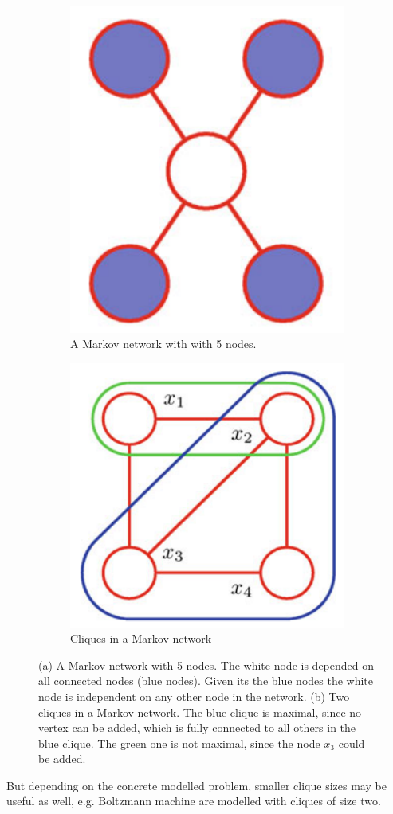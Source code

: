 \begin{figure}
	\centering
	\begin{subfigure}[t]{.5\textwidth}
  		\centering
  		\includegraphics[width=.5\linewidth]{imgs/markovnet1.png}
  		\caption{A Markov network with with 5 nodes.}
  		\label{fig:sub1}
	\end{subfigure}%
	\begin{subfigure}[t]{.5\textwidth}
  		\centering
  		\includegraphics[width=.5\linewidth]{imgs/markovnet2.png}
  		\caption{Cliques in a Markov network}
  		\label{fig:markovnet}
	\end{subfigure}
	\caption{(a) A Markov network with 5 nodes. The white node is depended on all connected nodes (blue nodes). Given its the blue nodes the white node is independent on any other node in the network. (b) Two cliques in a Markov network. The blue clique is maximal, since no vertex can be added, which is fully connected to all others in the blue clique. The green one is not maximal, since the node $x_3$ could be added.}
	\label{fig:test}
\end{figure}


But depending on the concrete modelled problem, smaller clique sizes may be useful as well, e.g. Boltzmann machine are modelled with cliques of size two.

